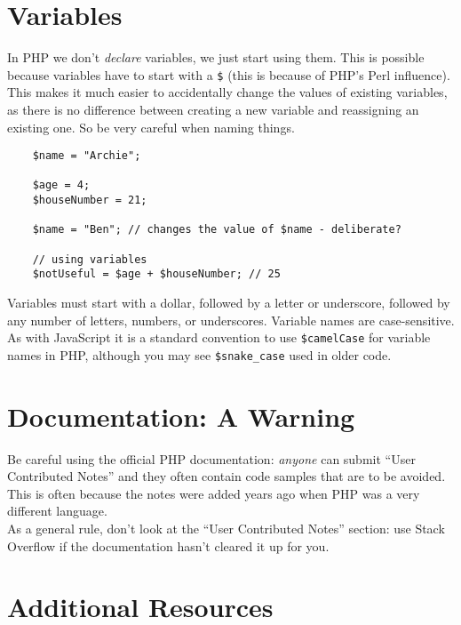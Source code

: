 \section{Variables}

In PHP we don't \textit{declare} variables, we just start using them. This is possible because variables have to start with a \texttt{\$} (this is because of PHP's Perl influence).
\\

This makes it much easier to accidentally change the values of existing variables, as there is no difference between creating a new variable and reassigning an existing one. So be very careful when naming things.

\begin{verbatim}
    $name = "Archie";

    $age = 4;
    $houseNumber = 21;

    $name = "Ben"; // changes the value of $name - deliberate?

    // using variables
    $notUseful = $age + $houseNumber; // 25
\end{verbatim}

Variables must start with a dollar, followed by a letter or underscore, followed by any number of letters, numbers, or underscores. Variable names are case-sensitive.
\\

As with JavaScript it is a standard convention to use \texttt{\$camelCase} for variable names in PHP, although you may see \texttt{\$snake\_case} used in older code.


\section{Documentation: A Warning}

Be careful using the official PHP documentation: \textit{anyone} can submit ``User Contributed Notes'' and they often contain code samples that are to be avoided. This is often because the notes were added years ago when PHP was a very different language.
\\

As a general rule, don't look at the ``User Contributed Notes'' section: use Stack Overflow if the documentation hasn't cleared it up for you.

\pagebreak

\section{Additional Resources}

